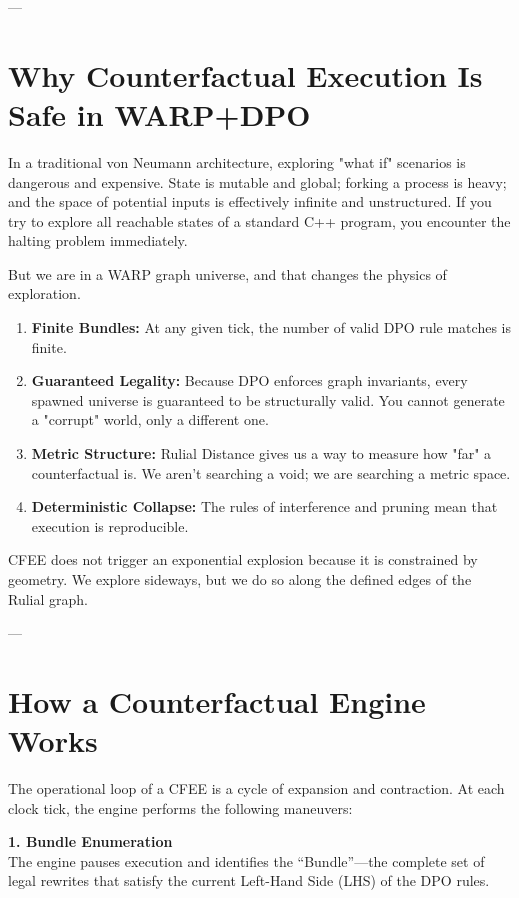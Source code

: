 ---

\section{Why Counterfactual Execution Is Safe in WARP+DPO}

In a traditional von Neumann architecture, exploring "what if" scenarios is dangerous and expensive. State is mutable and global; forking a process is heavy; and the space of potential inputs is effectively infinite and unstructured. If you try to explore all reachable states of a standard C++ program, you encounter the halting problem immediately.

But we are in a WARP graph universe, and that changes the physics of exploration.

\begin{enumerate}
    \item \textbf{Finite Bundles:} At any given tick, the number of valid DPO rule matches is finite.
    \item \textbf{Guaranteed Legality:} Because DPO enforces graph invariants, every spawned universe is guaranteed to be structurally valid. You cannot generate a "corrupt" world, only a different one.
    \item \textbf{Metric Structure:} Rulial Distance gives us a way to measure how "far" a counterfactual is. We aren't searching a void; we are searching a metric space.
    \item \textbf{Deterministic Collapse:} The rules of interference and pruning mean that execution is reproducible.
\end{enumerate}

CFEE does not trigger an exponential explosion because it is constrained by geometry. We explore sideways, but we do so along the defined edges of the Rulial graph.

---

\section{How a Counterfactual Engine Works}

The operational loop of a CFEE is a cycle of expansion and contraction. At each clock tick, the engine performs the following maneuvers:

\textbf{1. Bundle Enumeration} \\
The engine pauses execution and identifies the ``Bundle''—the complete set of legal rewrites that satisfy the current Left-Hand Side (LHS) of the DPO rules.

